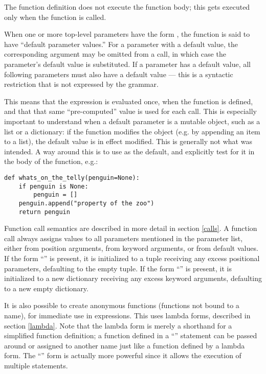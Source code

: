 The function definition does not execute the function body; this gets
executed only when the function is called.

When one or more top-level parameters have the form 
\code{=} , the function is said to have ``default
parameter values.''  For a parameter with a
default value, the corresponding argument may be omitted from a call,
in which case the parameter's default value is substituted.  If a
parameter has a default value, all following parameters must also have
a default value --- this is a syntactic restriction that is not
expressed by the grammar.

  This means that the expression is evaluated
once, when the function is defined, and that that same
``pre-computed'' value is used for each call.  This is especially
important to understand when a default parameter is a mutable object,
such as a list or a dictionary: if the function modifies the object
(e.g. by appending an item to a list), the default value is in effect
modified.  This is generally not what was intended.  A way around this 
is to use  as the default, and explicitly test for it in
the body of the function, e.g.:

\begin{verbatim}
def whats_on_the_telly(penguin=None):
    if penguin is None:
        penguin = []
    penguin.append("property of the zoo")
    return penguin
\end{verbatim}

Function call semantics are described in more detail in section
\ref{calls}. 
A function call always assigns values to all parameters mentioned in
the parameter list, either from position arguments, from keyword
arguments, or from default values.  If the form ``''
is present, it is initialized to a tuple receiving any excess
positional parameters, defaulting to the empty tuple.  If the form
``'' is present, it is initialized to a new
dictionary receiving any excess keyword arguments, defaulting to a
new empty dictionary.





It is also possible to create anonymous functions (functions not bound
to a name), for immediate use in expressions.  This uses lambda forms,
described in section \ref{lambda}.  Note that the lambda form is
merely a shorthand for a simplified function definition; a function
defined in a ``'' statement can be passed around or
assigned to another name just like a function defined by a lambda
form.  The ``'' form is actually more powerful since it
allows the execution of multiple statements.

